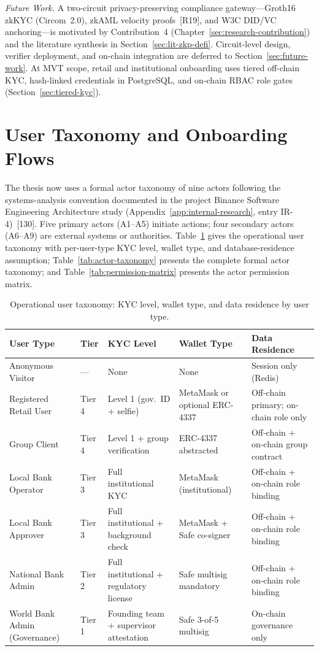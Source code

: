 \documentclass[12pt,a4paper]{report}
\newcommand{\tableheadcolor}{\rowcolor{TableHeadBg}}
\begin{document}
\noindent\textit{Future Work.} A two-circuit privacy-preserving compliance gateway---Groth16 zkKYC (Circom~2.0), zkAML velocity proofs~[R19], and W3C DID/VC anchoring---is motivated by Contribution~4 (Chapter~\ref{sec:research-contribution}) and the literature synthesis in Section~\ref{sec:lit-zkp-defi}. Circuit-level design, verifier deployment, and on-chain integration are deferred to Section~\ref{sec:future-work}. At MVT scope, retail and institutional onboarding uses tiered off-chain KYC, hash-linked credentials in PostgreSQL, and on-chain RBAC role gates (Section~\ref{sec:tiered-kyc}).

\section{User Taxonomy and Onboarding Flows}
\label{sec:onboarding}

The thesis now uses a formal actor taxonomy of nine actors following the systems-analysis convention documented in the project Binance Software Engineering Architecture study (Appendix~\ref{app:internal-research}, entry IR-4)~[130]. Five primary actors (A1--A5) initiate actions; four secondary actors (A6--A9) are external systems or authorities. Table~\ref{tab:user-taxonomy} gives the operational user taxonomy with per-user-type KYC level, wallet type, and database-residence assumption; Table~\ref{tab:actor-taxonomy} presents the complete formal actor taxonomy; and Table~\ref{tab:permission-matrix} presents the actor permission matrix.

\begin{table}[H]
\centering
\caption[Operational user taxonomy]{Operational user taxonomy: KYC level, wallet type, and data residence by user type.}
\label{tab:user-taxonomy}
\begin{tabular}{p{3.1cm}p{1.4cm}p{2.6cm}p{2.4cm}p{3.4cm}}
\toprule
\tableheadcolor
\textbf{User Type} & \textbf{Tier} & \textbf{KYC Level} & \textbf{Wallet Type} & \textbf{Data Residence} \\
\midrule
Anonymous Visitor & --- & None & None & Session only (Redis) \\
Registered Retail User & Tier 4 & Level 1 (gov.\ ID + selfie) & MetaMask or optional ERC-4337 & Off-chain primary; on-chain role only \\
Group Client & Tier 4 & Level 1 + group verification & ERC-4337 abstracted & Off-chain + on-chain group contract \\
Local Bank Operator & Tier 3 & Full institutional KYC & MetaMask (institutional) & Off-chain + on-chain role binding \\
Local Bank Approver & Tier 3 & Full institutional + background check & MetaMask + Safe co-signer & Off-chain + on-chain role binding \\
National Bank Admin & Tier 2 & Full institutional + regulatory license & Safe multisig mandatory & Off-chain + on-chain role binding \\
World Bank Admin (Governance) & Tier 1 & Founding team + supervisor attestation & Safe 3-of-5 multisig & On-chain governance only \\
\bottomrule
\end{tabular}
\end{table}
\end{document}
